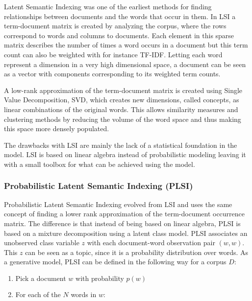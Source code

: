\documentclass[12pt]{report}
\begin{document}
Latent Semantic Indexing was one of the earliest methods for finding
relationships between documents and the words that occur in them. In LSI a
term-document matrix is created by analyzing the corpus, where the rows
correspond to words and columns to documents. Each element in this sparse
matrix describes the number of times a word occurs in a document but this term
count can also be weighted with for instance TF-IDF. Letting each word
represent a dimension in a very high dimensional space, a document can be seen
as a vector with components corresponding to its weighted term counts.

A low-rank approximation of the term-document matrix is created using Single
Value Decomposition, SVD, which creates new dimensions, called concepts, as
linear combinations of the original words. This allows similarity measures and
clustering methods by reducing the volume of the word space and thus making
this space more densely populated.


The drawbacks with LSI are mainly the lack of a statistical foundation in the
model. LSI is based on linear algebra instead of probabilistic modeling leaving
it with a small toolbox for what can be achieved using the model.
	

\subsubsection{Probabilistic Latent Semantic Indexing (PLSI)}


Probabilistic Latent Semantic Indexing evolved from LSI and uses the same
concept of finding a lower rank approximation of the term-document occurrence
matrix. The difference is that instead of being based on linear algebra, PLSI
is based on a mixture decomposition using a latent class model. PLSI associates
an unobserved class variable $z$ with each document-word observation pair $(w,
w)$. This $z$ can be seen as a topic, since it is a probability distribution
over words. As a generative model, PLSI can be defined in the following way for
a corpus $D$:

\begin{enumerate}
\item Pick a document $w$ with probability $p(w)$
\item For each of the $N$ words in $w$:
\end{enumerate}
\end{document}
